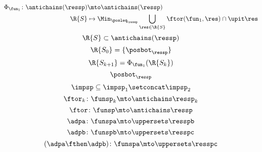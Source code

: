 {\begin{forslides}
\begin{equation*}
            \begin{aligned}
                \Phi_{\fun_1}\colon \antichains(\ressp)&\mto \antichains(\ressp)\\
                \R{S}&\mapsto \Min_{\posleq_\ressp} \bigcup_{\res \in \R{S}}\ftor(\fun_1,\res)\cap \upit \res
            \end{aligned}
        \end{equation*}
        \begin{equation*}
            \label{eq:genfun_11}
            \R{S}\subset \antichains(\ressp)
        \end{equation*}
        \begin{equation*}
            \label{eq:genfun_12}
            \R{S_0}=\{ \posbot_\ressp\}
        \end{equation*}
        \begin{equation*}
            \label{eq:genfun_13}
            \R{S_{k+1}}=\Phi_{\fun_1}(\R{S_k})
        \end{equation*}
        \begin{equation*}
            \label{eq:genfun_14}
            \posbot_{\ressp}
        \end{equation*}
        \begin{equation*}
            \label{eq:imp_comp}
            \impsp \subseteq \impsp_{1} \setconcat \impsp_{2}
        \end{equation*}
        \begin{equation*}
            \label{eq:dp_mob_4}
            \ftor_k\colon \funsp_k \mto \antichains \ressp_k
        \end{equation*}
        \begin{equation*}
            \label{eq:dp_mob_5}
            \ftor\colon \funsp \mto \antichains \ressp
        \end{equation*}
        \begin{equation*}
            \label{eq:dp_mob_6}
            \adpa\colon \funspa \mto \uppersets \resspb
        \end{equation*}
        \begin{equation*}
            \label{eq:dp_mob_7}
            \adpb\colon \funspb \mto \uppersets \resspc
        \end{equation*}
        \begin{equation*}
            \label{eq:dp_mob_8}
            (\adpa \fthen \adpb) \colon \funspa \mto \uppersets \resspc
        \end{equation*}
    \end{forslides}
}





